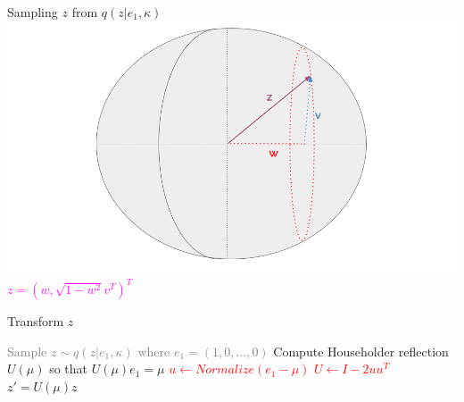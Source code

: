 \begin{frame}{Sampling $z$ from $q(z|e_1, \kappa)$}
  \centering
  \includegraphics[width=\textwidth]{figures/illustration_sampling_4.png}
  \textcolor{magenta}{$z = (w, \sqrt{1 - w^2}v^T)^T$}
\end{frame}

\begin{frame}{Transform $z$}
  \begin{algorithm}[H]
    \caption{Overview of the sampling method from $\mathcal{S}(\mu, \kappa)$}\label{alg:overviewsampling3}
    \begin{algorithmic}[1]
      \STATE \textcolor{gray}{ Sample $z \sim q(z| e_1, \kappa)$ where $e_1 = (1, 0, \dots, 0)$ }
      \STATE Compute Householder reflection $U(\mu)$ so that $U(\mu) e_1 = \mu$
      \textcolor{red}{
      \STATE $u \gets Normalize(e_1 - \mu)$ 
      \STATE $U \gets I - 2uu^T$}
      \RETURN $z' = U(\mu) z$
    \end{algorithmic}
    \end{algorithm}
\end{frame}